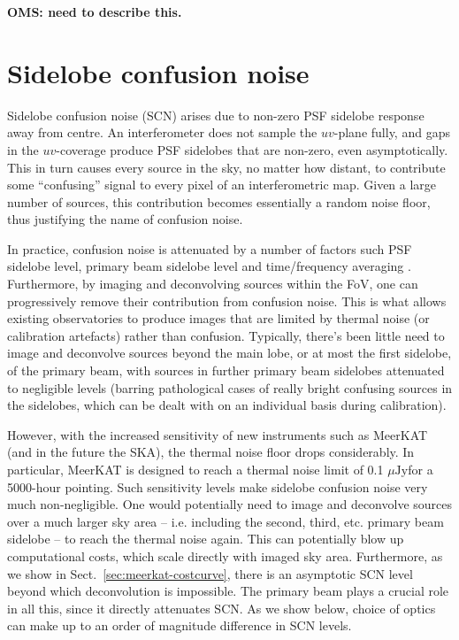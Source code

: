 \documentclass{aa}
\newcommand{\uJy}{$\mu\mathrm{Jy}$}
\begin{document}
{\bf OMS: need to describe this.}


\section{Sidelobe confusion noise}
\label{sec:fsn}

Sidelobe confusion noise (SCN) arises due to non-zero PSF sidelobe response away from centre. An interferometer does not sample the $uv$-plane fully, and gaps in the $uv$-coverage produce PSF sidelobes that are non-zero, even asymptotically. This in turn causes every source in the sky, no matter how distant, to contribute some ``confusing'' signal to every pixel of an interferometric map. Given a large number of sources, this contribution becomes essentially a random noise floor, thus justifying the name of confusion noise.

In practice, confusion noise is attenuated by a number of factors such PSF sidelobe level, primary beam sidelobe level and time/frequency averaging \citep[see Fig.~2 in][for an illustration]{SKA54-expa,SKA54}. Furthermore, by imaging and deconvolving sources within the FoV, one can progressively remove their contribution from confusion noise. This is what allows existing observatories to produce images that are limited by thermal noise (or calibration artefacts) rather than confusion. Typically, there's been little need to image and deconvolve sources beyond the main lobe, or at most the first sidelobe, of the primary beam, with sources in further primary beam sidelobes attenuated to negligible levels (barring pathological cases of really bright confusing sources in the sidelobes, which can be dealt with on an individual basis during calibration).

However, with the increased sensitivity of new instruments such as MeerKAT (and in the future the SKA), the thermal noise floor drops considerably. In particular, MeerKAT is designed to reach a thermal noise limit of 0.1 \uJy for a 5000-hour pointing. Such sensitivity levels make sidelobe confusion noise very much non-negligible. One would potentially need to image and deconvolve sources over a much larger sky area -- i.e. including the second, third, etc. primary beam sidelobe -- to reach the thermal noise again. This can potentially blow up computational costs, which scale directly with imaged sky area. Furthermore, as we show in Sect.~\ref{sec:meerkat-costcurve}, there is an asymptotic SCN level beyond which deconvolution is impossible. The primary beam plays a crucial role in all this, since it directly attenuates SCN. As we show below, choice of optics can make up to an order of magnitude difference in SCN levels.
\end{document}

